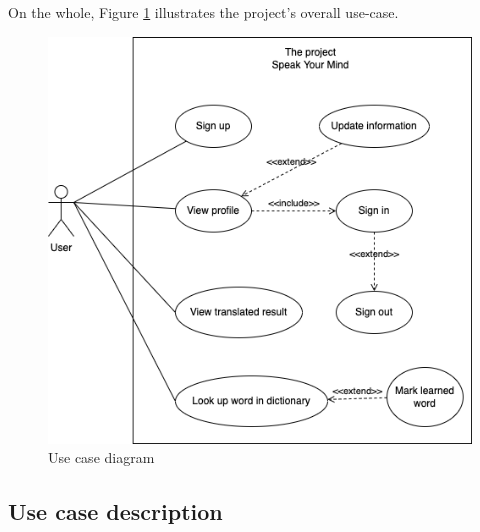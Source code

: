 On the whole, Figure \ref{fig:Chap4-usecase} illustrates the project's overall use-case.

\begin{figure}[H]
	\centering
	\includegraphics[width=\textwidth]{img/Chap4/use-case.drawio.png}
	\caption{Use case diagram}
  \label{fig:Chap4-usecase}
\end{figure}

\subsection{Use case description}

